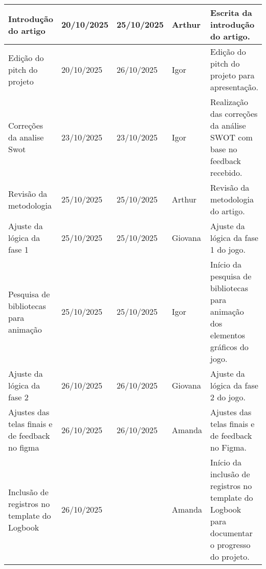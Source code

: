 \documentclass[
landscape,
  a4paper,%
  12pt,%
  english,%
  brazilian,%
]{article}
\begin{document}
\begin{table}[]
\begin{tabular}{|p{5cm}|l|l|l|p{8cm}|}
Introdução do artigo                               & 20/10/2025 & 25/10/2025 & Arthur   & Escrita da introdução do artigo. \\ \hline
Edição do pitch do projeto                          & 20/10/2025 & 26/10/2025 & Igor   & Edição do pitch do projeto para apresentação. \\ \hline
Correções da analise Swot                         & 23/10/2025 & 23/10/2025 & Igor   & Realização das correções da análise SWOT com base no feedback recebido. \\ \hline
Revisão da metodologia                             & 25/10/2025 & 25/10/2025 & Arthur   & Revisão da metodologia do artigo. \\ \hline
Ajuste da lógica da fase 1                         & 25/10/2025 & 25/10/2025 & Giovana   & Ajuste da lógica da fase 1 do jogo. \\ \hline
Pesquisa de bibliotecas para animação & 25/10/2025 & 25/10/2025 & Igor   & Início da pesquisa de bibliotecas para animação dos elementos gráficos do jogo. \\ \hline
Ajuste da lógica da fase 2                         & 26/10/2025 & 26/10/2025 & Giovana   & Ajuste da lógica da fase 2 do jogo. \\ \hline
Ajustes das telas finais e de feedback no figma    & 26/10/2025 & 26/10/2025 & Amanda   & Ajustes das telas finais e de feedback no Figma. \\ \hline
Inclusão de registros no template do Logbook & 26/10/2025 &       & Amanda   & Início da inclusão de registros no template do Logbook para documentar o progresso do projeto. \\ \hline
\end{tabular}
\end{table}
\end{document}
